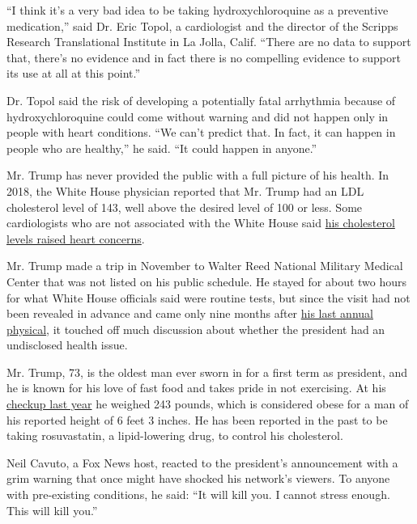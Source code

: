 ``I think it's a very bad idea to be taking hydroxychloroquine as a
preventive medication,'' said Dr. Eric Topol, a cardiologist and the
director of the Scripps Research Translational Institute in La Jolla,
Calif. ``There are no data to support that, there's no evidence and in
fact there is no compelling evidence to support its use at all at this
point.''

Dr. Topol said the risk of developing a potentially fatal arrhythmia
because of hydroxychloroquine could come without warning and did not
happen only in people with heart conditions. ``We can't predict that. In
fact, it can happen in people who are healthy,'' he said. ``It could
happen in anyone.''

Mr. Trump has never provided the public with a full picture of his
health. In 2018, the White House physician reported that Mr. Trump had
an LDL cholesterol level of 143, well above the desired level of 100 or
less. Some cardiologists who are not associated with the White House
said
\href{https://www.nytimes3xbfgragh.onion/2018/01/17/us/politics/trump-physical-heart-health-cholesterol.html}{his
cholesterol levels raised heart concerns}.

Mr. Trump made a trip in November to Walter Reed National Military
Medical Center that was not listed on his public schedule. He stayed for
about two hours for what White House officials said were routine tests,
but since the visit had not been revealed in advance and came only nine
months after
\href{https://slack-redir.net/link?url=https\%3A\%2F\%2Fwww.nytimes3xbfgragh.onion\%2F2019\%2F02\%2F14\%2Fus\%2Fpolitics\%2Ftrump-obese.html\%3Faction\%3Dclick\%26module\%3DRelatedLinks\%26pgtype\%3DArticle}{his
last annual physical}, it touched off much discussion about whether the
president had an undisclosed health issue.

Mr. Trump, 73, is the oldest man ever sworn in for a first term as
president, and he is known for his love of fast food and takes pride in
not exercising. At his
\href{https://www.nytimes3xbfgragh.onion/2019/02/14/us/politics/trump-obese.html}{checkup
last year} he weighed 243 pounds, which is considered obese for a man of
his reported height of 6 feet 3 inches. He has been reported in the past
to be taking rosuvastatin, a lipid-lowering drug, to control his
cholesterol.

Neil Cavuto, a Fox News host, reacted to the president's announcement
with a grim warning that once might have shocked his network's viewers.
To anyone with pre-existing conditions, he said: ``It will kill you. I
cannot stress enough. This will kill you.''

